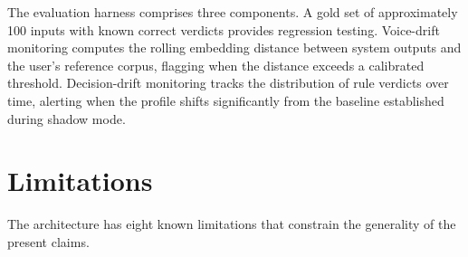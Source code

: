 \documentclass[11pt,a4paper]{article}
\begin{document}
The evaluation harness comprises three components. A gold set of approximately 100 inputs with known correct verdicts provides regression testing. Voice-drift monitoring computes the rolling embedding distance between system outputs and the user's reference corpus, flagging when the distance exceeds a calibrated threshold. Decision-drift monitoring tracks the distribution of rule verdicts over time, alerting when the profile shifts significantly from the baseline established during shadow mode.

\section{Limitations}

The architecture has eight known limitations that constrain the generality of the present claims.
\end{document}
